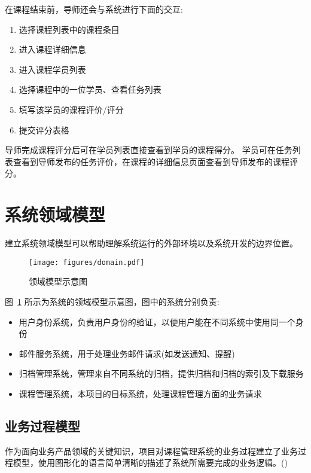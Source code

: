 在课程结束前，导师还会与系统进行下面的交互:

\begin{enumerate}
  \item 选择课程列表中的课程条目
  \item 进入课程详细信息
  \item 进入课程学员列表
  \item 选择课程中的一位学员、查看任务列表
  \item 填写该学员的课程评价/评分
  \item 提交评分表格
\end{enumerate}

导师完成课程评分后可在学员列表直接查看到学员的课程得分。 学员可在任务列表查看到导师发布的任务评价，在课程的详细信息页面查看到导师发布的课程评分。

\newpage

\section{系统领域模型}

建立系统领域模型可以帮助理解系统运行的外部环境以及系统开发的边界位置。

\begin{figure}[!hbp]
  \begin{center}
    \texttt{[image: figures/domain.pdf]}
    \caption{领域模型示意图\label{DomainModel}}
  \end{center}
\end{figure}

图~\ref{DomainModel} 所示为系统的领域模型示意图，图中的系统分别负责:

\begin{itemize}
\item 用户身份系统，负责用户身份的验证，以便用户能在不同系统中使用同一个身份
\item 邮件服务系统，用于处理业务邮件请求(如发送通知、提醒)
\item 归档管理系统，管理来自不同系统的归档，提供归档和归档的索引及下载服务
\item 课程管理系统，本项目的目标系统，处理课程管理方面的业务请求
\end{itemize}

\subsection{业务过程模型}

作为面向业务产品领域的关键知识，项目对课程管理系统的业务过程建立了业务过程模型，使用图形化的语言简单清晰的描述了系统所需要完成的业务逻辑。()

